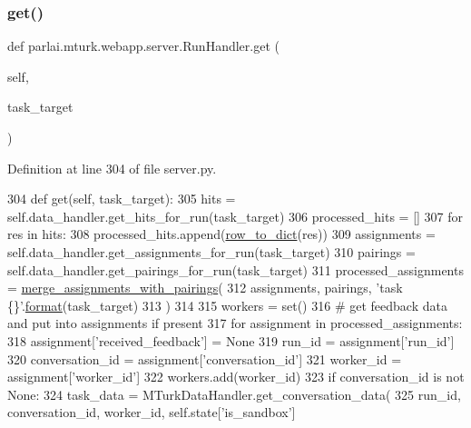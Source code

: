 \subsubsection{\texorpdfstring{get()}{get()}}
{\footnotesize\ttfamily def parlai.\+mturk.\+webapp.\+server.\+Run\+Handler.\+get (\begin{DoxyParamCaption}\item[{}]{self,  }\item[{}]{task\+\_\+target }\end{DoxyParamCaption})}



Definition at line 304 of file server.\+py.


\begin{DoxyCode}
304     \textcolor{keyword}{def }get(self, task\_target):
305         hits = self.data\_handler.get\_hits\_for\_run(task\_target)
306         processed\_hits = []
307         \textcolor{keywordflow}{for} res \textcolor{keywordflow}{in} hits:
308             processed\_hits.append(\hyperlink{namespaceparlai_1_1mturk_1_1webapp_1_1server_a92be47964fa33a4b6a14d4069d091c7d}{row\_to\_dict}(res))
309         assignments = self.data\_handler.get\_assignments\_for\_run(task\_target)
310         pairings = self.data\_handler.get\_pairings\_for\_run(task\_target)
311         processed\_assignments = \hyperlink{namespaceparlai_1_1mturk_1_1webapp_1_1server_abe6ddbf97d0e5c26315fa927ed076489}{merge\_assignments\_with\_pairings}(
312             assignments, pairings, \textcolor{stringliteral}{'task \{\}'}.\hyperlink{namespaceparlai_1_1chat__service_1_1services_1_1messenger_1_1shared__utils_a32e2e2022b824fbaf80c747160b52a76}{format}(task\_target)
313         )
314 
315         workers = set()
316         \textcolor{comment}{# get feedback data and put into assignments if present}
317         \textcolor{keywordflow}{for} assignment \textcolor{keywordflow}{in} processed\_assignments:
318             assignment[\textcolor{stringliteral}{'received\_feedback'}] = \textcolor{keywordtype}{None}
319             run\_id = assignment[\textcolor{stringliteral}{'run\_id'}]
320             conversation\_id = assignment[\textcolor{stringliteral}{'conversation\_id'}]
321             worker\_id = assignment[\textcolor{stringliteral}{'worker\_id'}]
322             workers.add(worker\_id)
323             \textcolor{keywordflow}{if} conversation\_id \textcolor{keywordflow}{is} \textcolor{keywordflow}{not} \textcolor{keywordtype}{None}:
324                 task\_data = MTurkDataHandler.get\_conversation\_data(
325                     run\_id, conversation\_id, worker\_id, self.state[\textcolor{stringliteral}{'is\_sandbox'}]

\end{DoxyCode}

